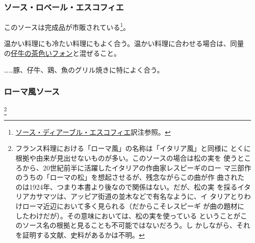 \begin{recette}
\hypertarget{sauce-robert-escoffier}{%
\subsubsection{ソース・ロベール・エスコフィエ}\label{sauce-robert-escoffier}}



このソースは完成品が市販されている\footnote{\protect\hyperlink{sauce-diable-escoffier}{ソース・ディアーブル・エスコフィエ}訳注参照。}。

温かい料理にも冷たい料理にもよく合う。温かい料理に合わせる場合は、同量
の\protect\hyperlink{jus-de-veau-brun}{仔牛の茶色いフォン}と混ぜること。

\ldots{}\ldots{}豚、仔牛、鶏、魚のグリル焼きに特によく合う。

\hypertarget{sauce-romaine}{%
\subsubsection{ローマ風ソース}\label{sauce-romaine}}

\footnote{フランス料理における「ローマ風」の名称は「イタリア風」と同様に
  とくに根拠や由来が見出せないものが多い。このソースの場合は松の実を
  使うところから、20世紀前半に活躍したイタリアの作曲家レスピーギのロー
  マ三部作のうちの「ローマの松」を想起させるが、残念ながらこの曲が作
  曲されたのは1924年、つまり本書より後なので関係はない。だが、松の実
  を採るイタリアカサマツは、アッピア街道の並木などで有名なように、イ
  タリアとりわけローマ近辺において多く見られる（だからこそレスピーギ
  が曲の題材にしたわけだが）。その意味においては、松の実を使っている
  ということがこのソース名の根拠と見ることも不可能ではないだろう。し
  かしながら、それを証明する文献、史料があるかは不明。}



\end{recette}
